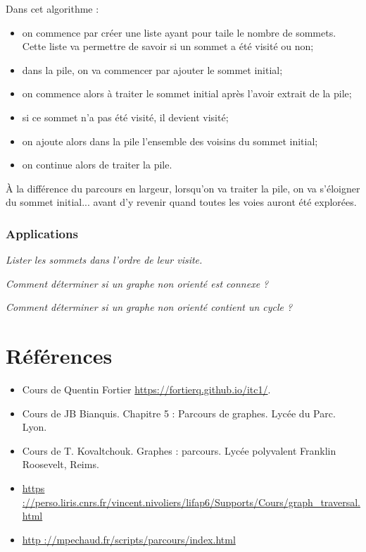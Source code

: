 Dans cet algorithme : 
\begin{itemize}
\item on commence par créer une liste ayant pour taile le nombre de sommets. Cette liste va permettre de savoir si un sommet a été visité ou non;
\item dans la pile, on va commencer par ajouter le sommet initial;
\item on commence alors à traiter le sommet initial après l'avoir extrait de la pile;
\item si ce sommet n'a pas été visité, il devient visité;
\item on ajoute alors dans la pile l'ensemble des voisins du sommet initial;
\item on continue alors de traiter la pile. 
\end{itemize}
À la différence du parcours en largeur, lorsqu'on va traiter la pile, on va s'éloigner du sommet initial... avant d'y revenir quand toutes les voies auront été explorées. 

\subsubsection{Applications}
\begin{exemple}
\textit{Lister les sommets dans l'ordre de leur visite.}
\end{exemple}


\begin{exemple}
\textit{Comment déterminer si un graphe non orienté est connexe ?}
\end{exemple}


\begin{exemple}
\textit{Comment déterminer si un graphe non orienté contient un cycle ?}
\end{exemple}

\section*{Références}

\begin{itemize}
\item Cours de Quentin Fortier \url{https://fortierq.github.io/itc1/}.
\item Cours de JB Bianquis. Chapitre 5 : Parcours de graphes. Lycée du Parc. Lyon.
\item Cours de T. Kovaltchouk. Graphes : parcours. Lycée polyvalent Franklin Roosevelt, Reims.
\item \url{https ://perso.liris.cnrs.fr/vincent.nivoliers/lifap6/Supports/Cours/graph_traversal.html}
\item \url{http ://mpechaud.fr/scripts/parcours/index.html}
\end{itemize}
